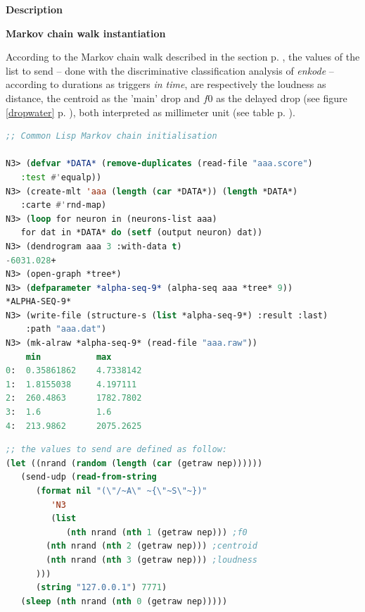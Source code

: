 
\newpage

\noindent \textbf{{\large Description}}
\hrulefill

\bigskip

  \textbf{
  Markov chain walk instantiation }
  
  \smallskip
 
 According to the Markov chain walk described in the section \textsl{} p. \pageref{osc}, 
 the values of the list to send -- done with the discriminative classification analysis of \textsl{enkode} -- according to durations as triggers \textit{in time}, are respectively the loudness as distance, the centroid as the 'main' drop and $f0$ as the delayed drop (see figure \ref{dropwater} p. \pageref{dropwater}), both interpreted as millimeter unit (see table p. \pageref{tab:apc}).
  
 \bigskip
\begin{lstlisting}[basicstyle=\footnotesize\ttfamily,language=Lisp]
;; Common Lisp Markov chain initialisation

N3> (defvar *DATA* (remove-duplicates (read-file "aaa.score")
   :test #'equalp))
N3> (create-mlt 'aaa (length (car *DATA*)) (length *DATA*)
   :carte #'rnd-map)
N3> (loop for neuron in (neurons-list aaa)
   for dat in *DATA* do (setf (output neuron) dat))
N3> (dendrogram aaa 3 :with-data t)
-6031.028+
N3> (open-graph *tree*)
N3> (defparameter *alpha-seq-9* (alpha-seq aaa *tree* 9))
*ALPHA-SEQ-9*
N3> (write-file (structure-s (list *alpha-seq-9*) :result :last) 
    :path "aaa.dat")
N3> (mk-alraw *alpha-seq-9* (read-file "aaa.raw"))
    min           max
0:  0.35861862    4.7338142
1:  1.8155038     4.197111
2:  260.4863      1782.7802
3:  1.6           1.6
4:  213.9862      2075.2625
\end{lstlisting}

\smallskip

\begin{lstlisting}[basicstyle=\footnotesize\ttfamily,language=Lisp]
;; the values to send are defined as follow:
(let ((nrand (random (length (car (getraw nep))))))
   (send-udp (read-from-string 
      (format nil "(\"/~A\" ~{\"~S\"~})"
         'N3
         (list
            (nth nrand (nth 1 (getraw nep))) ;f0
	    (nth nrand (nth 2 (getraw nep))) ;centroid
	    (nth nrand (nth 3 (getraw nep))) ;loudness
	  ))) 
      (string "127.0.0.1") 7771)
   (sleep (nth nrand (nth 0 (getraw nep)))))
\end{lstlisting}

